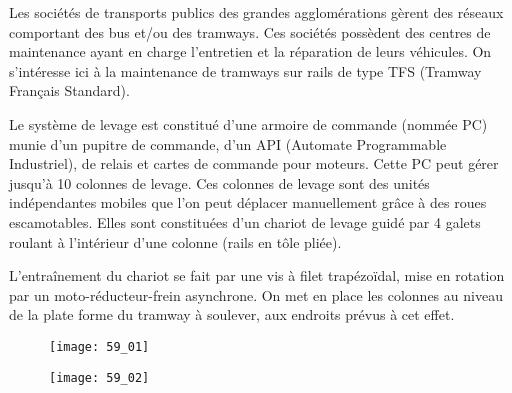 \normaltrue \difficilefalse \tdifficilefalse
\correctionfalse

\setcounter{question}{0}

\ifcorrection
\else
{}
\fi

\ifprof
\else

Les sociétés de transports publics des grandes agglomérations gèrent des réseaux comportant des
bus et/ou des tramways. Ces sociétés possèdent des centres de maintenance ayant en charge
l’entretien et la réparation de leurs véhicules. %
On s'intéresse ici à la maintenance de tramways sur rails de type
TFS (Tramway Français Standard).


Le système de levage est constitué d’une armoire de commande (nommée PC) munie d’un pupitre
de commande, d’un API (Automate Programmable Industriel), de relais et cartes de commande
pour moteurs. Cette PC peut gérer jusqu’à 10 colonnes de levage. Ces colonnes de levage sont des unités indépendantes mobiles que l’on peut déplacer manuellement
grâce à des roues escamotables. Elles sont constituées d’un chariot de levage guidé par 4 galets roulant à l’intérieur d’une colonne (rails
en tôle pliée). 


L’entraînement du chariot se fait par une vis à filet trapézoïdal, mise en rotation par un moto-réducteur-frein asynchrone. On met en place les colonnes au
niveau de la plate forme du tramway à soulever, aux endroits prévus à cet effet.


\begin{figure}[H]
\centering
\texttt{[image: 59\_01]}
\end{figure}

\begin{figure}[H]
\centering
\texttt{[image: 59\_02]}
\end{figure}


